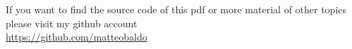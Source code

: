 \newpage 


\begin{center}
If you want to find the source code of this pdf or more material of other topics please visit my github account\\
\url{https://github.com/matteobaldo}
\end{center}

